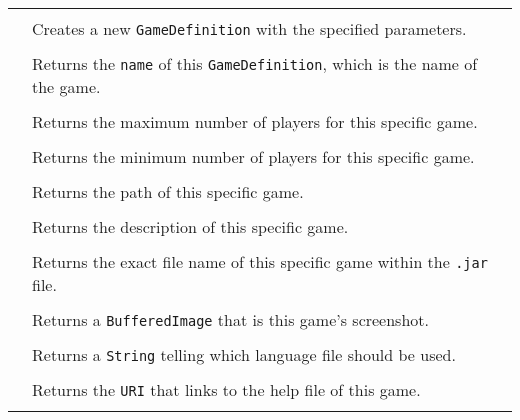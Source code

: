\paragraph*{}
\begin{longtable}{Lp{10cm}}
	\startmethodtable
	 \\
	& Creates a new \texttt{GameDefinition} with the specified parameters. \\
	 \\
	& Returns the \texttt{name} of this \texttt{GameDefinition}, which is the name of the game. \\
	 \\
	& Returns the maximum number of players for this specific game. \\
	 \\
	& Returns the minimum number of players for this specific game. \\
	 \\
	& Returns the path of this specific game. \\ 
	 \\
	& Returns the description of this specific game. \\
	 \\
	& Returns the exact file name of this specific game within the \texttt{.jar} file. \\
	 \\
	& Returns a \texttt{BufferedImage} that is this game's screenshot. \\
	 \\
	& Returns a \texttt{String} telling which language file should be used. \\
	 \\
	& Returns the \texttt{URI} that links to the help file of this game. \\
	 \\

\end{longtable}
